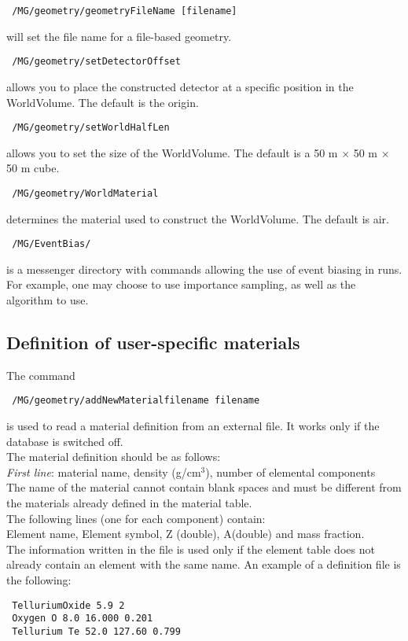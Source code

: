 \begin{lstlisting}
 /MG/geometry/geometryFileName [filename]
\end{lstlisting}
\noindent will set the file name for a file-based geometry. \\
%

\begin{lstlisting}
 /MG/geometry/setDetectorOffset
\end{lstlisting}
\noindent allows you to place the constructed detector at a specific position in
the WorldVolume.  The default is the origin. \\

\begin{lstlisting}
 /MG/geometry/setWorldHalfLen
\end{lstlisting}
\noindent allows you to set the size of the WorldVolume.  The default is a 50 m
$\times$ 50 m $\times$ 50 m cube. \\

\begin{lstlisting}
 /MG/geometry/WorldMaterial
\end{lstlisting}
determines the material used to construct the WorldVolume.  The default is air.

\begin{lstlisting}
 /MG/EventBias/
\end{lstlisting}
is a messenger directory with commands allowing the use of event biasing in
runs.  For example, one may choose to use importance sampling, as well as the
algorithm to use.


\subsection{Definition of user-specific materials} \label{subsection:materials}
The command 
\begin{lstlisting}
 /MG/geometry/addNewMaterialfilename filename
\end{lstlisting}
is used to read a material definition from an external file. It works only 
if the database is switched off. \\
The material definition should be as follows: \\
\emph{First line}: material name, density (g/cm$^3$), number of elemental components \\
The name of the material cannot contain blank spaces and must be different from 
the materials already defined in the material table. \\
The following lines (one for each component) contain: \\
 Element name, Element symbol, Z (double), A(double) and mass fraction. \\
The information written in the file is used only if the element table does not 
already contain an element with the same name. An example of a definition file 
is the following:
\begin{lstlisting}
 TelluriumOxide 5.9 2
 Oxygen O 8.0 16.000 0.201 
 Tellurium Te 52.0 127.60 0.799
\end{lstlisting}

